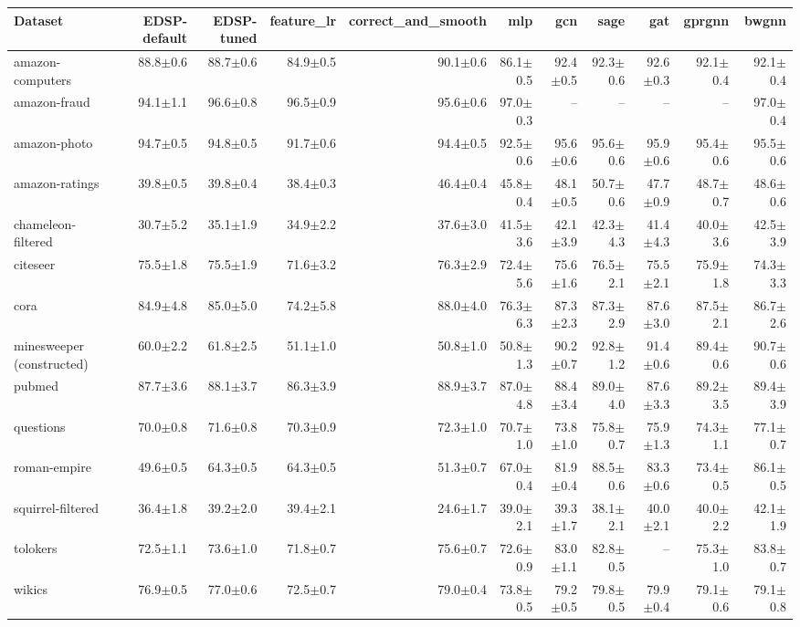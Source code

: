 \begin{tabular}{lrrrrrrrrrr}
\toprule
Dataset & EDSP-default & EDSP-tuned & feature\_lr & correct\_and\_smooth & mlp & gcn & sage & gat & gprgnn & bwgnn \\
\midrule
amazon-computers & 88.8$\pm$0.6 & 88.7$\pm$0.6 & 84.9$\pm$0.5 & 90.1$\pm$0.6 & 86.1$\pm$0.5 & 92.4$\pm$0.5 & 92.3$\pm$0.6 & 92.6$\pm$0.3 & 92.1$\pm$0.4 & 92.1$\pm$0.4 \\
amazon-fraud & 94.1$\pm$1.1 & 96.6$\pm$0.8 & 96.5$\pm$0.9 & 95.6$\pm$0.6 & 97.0$\pm$0.3 & -- & -- & -- & -- & 97.0$\pm$0.4 \\
amazon-photo & 94.7$\pm$0.5 & 94.8$\pm$0.5 & 91.7$\pm$0.6 & 94.4$\pm$0.5 & 92.5$\pm$0.6 & 95.6$\pm$0.6 & 95.6$\pm$0.6 & 95.9$\pm$0.6 & 95.4$\pm$0.6 & 95.5$\pm$0.6 \\
amazon-ratings & 39.8$\pm$0.5 & 39.8$\pm$0.4 & 38.4$\pm$0.3 & 46.4$\pm$0.4 & 45.8$\pm$0.4 & 48.1$\pm$0.5 & 50.7$\pm$0.6 & 47.7$\pm$0.9 & 48.7$\pm$0.7 & 48.6$\pm$0.6 \\
chameleon-filtered & 30.7$\pm$5.2 & 35.1$\pm$1.9 & 34.9$\pm$2.2 & 37.6$\pm$3.0 & 41.5$\pm$3.6 & 42.1$\pm$3.9 & 42.3$\pm$4.3 & 41.4$\pm$4.3 & 40.0$\pm$3.6 & 42.5$\pm$3.9 \\
citeseer & 75.5$\pm$1.8 & 75.5$\pm$1.9 & 71.6$\pm$3.2 & 76.3$\pm$2.9 & 72.4$\pm$5.6 & 75.6$\pm$1.6 & 76.5$\pm$2.1 & 75.5$\pm$2.1 & 75.9$\pm$1.8 & 74.3$\pm$3.3 \\
cora & 84.9$\pm$4.8 & 85.0$\pm$5.0 & 74.2$\pm$5.8 & 88.0$\pm$4.0 & 76.3$\pm$6.3 & 87.3$\pm$2.3 & 87.3$\pm$2.9 & 87.6$\pm$3.0 & 87.5$\pm$2.1 & 86.7$\pm$2.6 \\
minesweeper (constructed) & 60.0$\pm$2.2 & 61.8$\pm$2.5 & 51.1$\pm$1.0 & 50.8$\pm$1.0 & 50.8$\pm$1.3 & 90.2$\pm$0.7 & 92.8$\pm$1.2 & 91.4$\pm$0.6 & 89.4$\pm$0.6 & 90.7$\pm$0.6 \\
pubmed & 87.7$\pm$3.6 & 88.1$\pm$3.7 & 86.3$\pm$3.9 & 88.9$\pm$3.7 & 87.0$\pm$4.8 & 88.4$\pm$3.4 & 89.0$\pm$4.0 & 87.6$\pm$3.3 & 89.2$\pm$3.5 & 89.4$\pm$3.9 \\
questions & 70.0$\pm$0.8 & 71.6$\pm$0.8 & 70.3$\pm$0.9 & 72.3$\pm$1.0 & 70.7$\pm$1.0 & 73.8$\pm$1.0 & 75.8$\pm$0.7 & 75.9$\pm$1.3 & 74.3$\pm$1.1 & 77.1$\pm$0.7 \\
roman-empire & 49.6$\pm$0.5 & 64.3$\pm$0.5 & 64.3$\pm$0.5 & 51.3$\pm$0.7 & 67.0$\pm$0.4 & 81.9$\pm$0.4 & 88.5$\pm$0.6 & 83.3$\pm$0.6 & 73.4$\pm$0.5 & 86.1$\pm$0.5 \\
squirrel-filtered & 36.4$\pm$1.8 & 39.2$\pm$2.0 & 39.4$\pm$2.1 & 24.6$\pm$1.7 & 39.0$\pm$2.1 & 39.3$\pm$1.7 & 38.1$\pm$2.1 & 40.0$\pm$2.1 & 40.0$\pm$2.2 & 42.1$\pm$1.9 \\
tolokers & 72.5$\pm$1.1 & 73.6$\pm$1.0 & 71.8$\pm$0.7 & 75.6$\pm$0.7 & 72.6$\pm$0.9 & 83.0$\pm$1.1 & 82.8$\pm$0.5 & -- & 75.3$\pm$1.0 & 83.8$\pm$0.7 \\
wikics & 76.9$\pm$0.5 & 77.0$\pm$0.6 & 72.5$\pm$0.7 & 79.0$\pm$0.4 & 73.8$\pm$0.5 & 79.2$\pm$0.5 & 79.8$\pm$0.5 & 79.9$\pm$0.4 & 79.1$\pm$0.6 & 79.1$\pm$0.8 \\
\bottomrule
\end{tabular}
